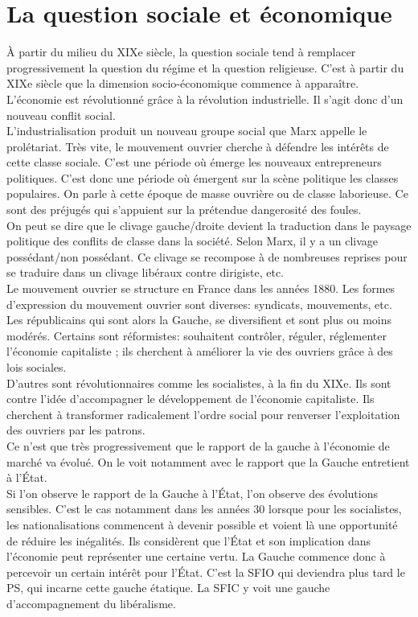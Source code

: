 \documentclass[10pt, a4paper, openany]{book}
\begin{document}
\section{La question sociale et économique}

À partir du milieu du XIXe siècle, la question sociale tend à remplacer progressivement la question du régime et la question religieuse. C'est à partir du XIXe siècle que la dimension socio-économique commence à apparaître. L'économie est révolutionné grâce à la révolution industrielle. Il s'agit donc d'un nouveau conflit social. \\
L'industrialisation produit un nouveau groupe social que Marx appelle le prolétariat. Très vite, le mouvement ouvrier cherche à défendre les intérêts de cette classe sociale. C'est une période où émerge les nouveaux entrepreneurs politiques. C'est donc une période où émergent sur la scène politique les classes populaires. On parle à cette époque de masse ouvrière ou de classe laborieuse. Ce sont des préjugés qui s'appuient sur la prétendue dangerosité des foules. \\
On peut se dire que le clivage gauche/droite devient la traduction dans le paysage politique des conflits de classe dans la société. Selon Marx, il y a un clivage possédant/non possédant. Ce clivage se recompose à de nombreuses reprises pour se traduire dans un clivage libéraux contre dirigiste, etc. \\
Le mouvement ouvrier se structure en France dans les années 1880. Les formes d'expression du mouvement ouvrier sont diverses: syndicats, mouvements, etc. Les républicains qui sont alors la Gauche, se diversifient et sont plus ou moins modérés. Certains sont réformistes: souhaitent contrôler, réguler, réglementer l'économie capitaliste ; ils cherchent à améliorer la vie des ouvriers grâce à des lois sociales. \\
D'autres sont révolutionnaires comme les socialistes, à la fin du XIXe. Ils sont contre l'idée d'accompagner le développement de l'économie capitaliste. Ils cherchent à transformer radicalement l'ordre social pour renverser l'exploitation des ouvriers par les patrons. \\
Ce n'est que très progressivement que le rapport de la gauche à l'économie de marché va évolué. On le voit notamment avec le rapport que la Gauche entretient à l'État. \\
Si l'on observe le rapport de la Gauche à l'État, l'on observe des évolutions sensibles. C'est le cas notamment dans les années 30 lorsque pour les socialistes, les nationalisations commencent à devenir possible et voient là une opportunité de réduire les inégalités. Ils considèrent que l'État et son implication dans l'économie peut représenter une certaine vertu. La Gauche commence donc à percevoir un certain intérêt pour l'État. C'est la SFIO qui deviendra plus tard le PS, qui incarne cette gauche étatique. La SFIC y voit une gauche d'accompagnement du libéralisme. 
\end{document}
